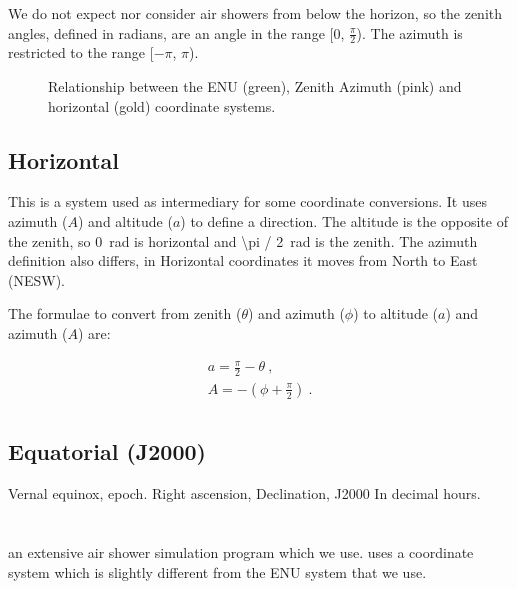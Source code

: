 We do not expect nor consider air showers from below the horizon, so the
zenith angles, defined in radians, are an angle in the range [0,
$\frac{\pi}{2}$). The azimuth is restricted to the range [$-\pi$, $\pi$).

\begin{figure}
    \centering
    
    \caption{Relationship between the ENU (green), Zenith Azimuth (pink)
             and horizontal (gold) coordinate systems.}
    \label{fig:enu_horizontal}
\end{figure}

\subsection{Horizontal}

This is a system used as intermediary for some coordinate conversions.
It uses azimuth ($A$) and altitude ($a$) to define a direction. The
altitude is the opposite of the zenith, so \SI{0}{\radian} is horizontal
and \SI{\pi / 2}{\radian} is the zenith. The azimuth definition also
differs, in Horizontal coordinates it moves from North to East (NESW).

The formulae to convert from zenith ($\theta$) and azimuth ($\phi$) to
altitude ($a$) and azimuth ($A$) are:

\begin{equation}
    \begin{array}{l}
        a = \frac{\pi}{2} - \theta \ , \\
        A = - (\phi + \frac{\pi}{2}) \ . \\
    \end{array}
\end{equation}


\subsection{Equatorial (J2000)}

Vernal equinox, epoch.
Right ascension, Declination, J2000
In decimal hours.


\section{\corsika}

\corsika an extensive air shower simulation program which we use.
\corsika uses a coordinate system which is slightly different from the
ENU system that we use\cite{corsika}.


